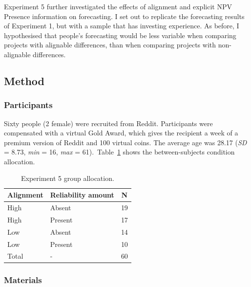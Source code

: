 \documentclass[a4paper, nobind, dvipsnames]{templates/ociamthesis}
\theoremstyle{definition}
\theoremstyle{definition}
\theoremstyle{definition}
\theoremstyle{definition}
\theoremstyle{remark}
\begin{document}
Experiment 5 further investigated the effects of alignment and explicit NPV
Presence information on forecasting. I set out to replicate the forecasting
results of Experiment 1, but with a sample that has investing experience. As
before, I hypothesised that people's forecasting would be less variable when
comparing projects with alignable differences, than when comparing projects with
non-alignable differences.

\subsection{Method}

\subsubsection{Participants}

Sixty people (2 female) were recruited from Reddit. Participants were compensated with a virtual Gold Award, which gives the recipient a week of a premium version of Reddit and 100 virtual coins. The average age was 28.17 (\emph{SD} = 8.73, \emph{min} = 16, \emph{max} = 61).~Table~\ref{tab:condition-allocation-alignment-4}
shows the between-subjects condition allocation.

\begin{table}[tbp]

\begin{center}
\begin{threeparttable}

\caption{\label{tab:condition-allocation-alignment-4}Experiment 5 group allocation.}

\begin{tabular}{lll}
\toprule
Alignment & \multicolumn{1}{c}{Reliability amount} & \multicolumn{1}{c}{N}\\
\midrule
High & Absent & 19\\
High & Present & 17\\
Low & Absent & 14\\
Low & Present & 10\\
Total & - & 60\\
\bottomrule
\end{tabular}

\end{threeparttable}
\end{center}

\end{table}

\subsubsection{Materials}
\end{document}
